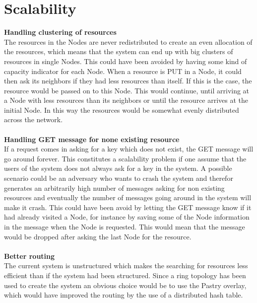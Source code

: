 \section{Scalability}
\textbf{\large{Handling clustering of resources}}\\
The resources in the Nodes are never redistributed to create an even allocation of the resources, which means that the system can end up with big clusters of resources in single Nodes. This could have been avoided by having some kind of capacity indicator for each Node. When a resource is PUT in a Node, it could then ask its neighbors if they had less resources than itself. If this is the case, the resource would be passed on to this Node. This would continue, until arriving at a Node with less resources than its neighbors or until the resource arrives at the initial Node. In this way the resources would be somewhat evenly distributed across the network.\\\\
\textbf{\large{Handling GET message for none existing resource}}\\
If a request comes in asking for a key which does not exist, the GET message will go around forever. This constitutes a scalability problem if one assume that the users of the system does not always ask for a key in the system. A possible scenario could be an adversary who wants to crash the system and therefor generates an arbitrarily high number of messages asking for non existing resources and eventually the number of messages going around in the system will make it crash.
This could have been avoid by letting the GET message know if it had already visited a Node, for instance by saving some of the Node information in the message when the Node is requested. This would mean that the message would be dropped after asking the last Node for the resource.\\\\
\textbf{\large{Better routing}}\\
The current system is unstructured which makes the searching for resources less efficient than if the system had been structured. Since a ring topology has been used to create the system an obvious choice would be to use the Pastry overlay, which would have improved the routing by the use of a distributed hash table.